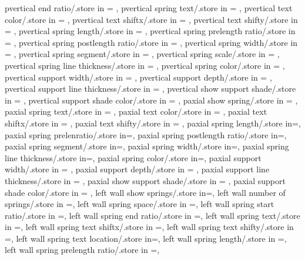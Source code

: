 {  pvertical end ratio/.store in = \pverspringendratio,
  pvertical spring text/.store in = \pverspringtext,
  pvertical text color/.store in = \pvertextcolor,
  pvertical text shiftx/.store in = \pvertextshiftx,
  pvertical text shifty/.store in = \pvertextshifty,
  pvertical spring length/.store in = \pverspringlength,
  pvertical spring prelength ratio/.store in = \pverprelenratio,
  pvertical spring postlength ratio/.store in = \pverpostlenratio,
  pvertical spring width/.store in = \pverampl,
  pvertical spring segment/.store in = \pversegm,
  pvertical spring scale/.store in = \pverspringscale,
  pvertical spring line thickness/.store in = \pverspringthk,
  pvertical spring color/.store in = \pverspringcolor,
  pvertical support width/.store in = \pversuppwidth,
  pvertical support depth/.store in = \pversuppdepth,
  pvertical support line thickness/.store in = \pversupplinethk,
  pvertical show support shade/.store in = \pvershowsuppshade,
  pvertical support shade color/.store in = \pversuppshadecol,
  paxial show spring/.store in = \showpaxialspring,
  paxial spring text/.store in = \paxialspringtext,
  paxial text color/.store in = \paxialtextcolor,
  paxial text shiftx/.store in = \paxialtextshiftx,
  paxial text shifty/.store in = \paxialtextshifty,
  paxial spring length/.store in=\paxialspringlength,
  paxial spring prelenratio/.store in=\paxialspringprelenratio,
  paxial spring postlength ratio/.store in=\paxialspringpostlenratio,
  paxial spring segment/.store in=\paxialspringsegm,
  paxial spring width/.store in=\paxialspringwidth,
  paxial spring line thickness/.store in=\paxialspringlinethk,
  paxial spring color/.store in=\paxialspringcolor,
  paxial support width/.store in = \paxialsuppwidth,
  paxial support depth/.store in = \paxialsuppdepth,
  paxial support line thickness/.store in = \paxialsupplinethk,
  paxial show support shade/.store in = \paxialshowsuppshade,
  paxial support shade color/.store in = \paxialsuppshadecol,
  left wall show springs/.store in=\leftwshowsprings,
  left wall number of springs/.store in =\leftwspringnumber,
  left wall spring space/.store in =\leftwspringspace,
  left wall spring start ratio/.store in =\leftwspringstartratio,
  left wall spring end ratio/.store in =\leftwspringendratio,
  left wall spring text/.store in =\leftwspringtext,
  left wall spring text shiftx/.store in =\leftwtextshiftx,
  left wall spring text shifty/.store in =\leftwtextshifty,
  left wall spring text location/.store in=\leftwspringtextloc,
  left wall spring length/.store in =\leftwspringlength,
  left wall spring prelength ratio/.store in =\leftwprelenratio,
}
